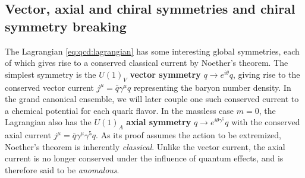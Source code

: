 \subsection*{Vector, axial and chiral symmetries and chiral symmetry breaking}

The Lagrangian \eqref{eq:qcd:lagrangian} has some interesting global symmetries, each of which gives rise to a conserved classical current by Noether's theorem.
The simplest symmetry is the $U(1)_V$ \textbf{vector symmetry} $q \rightarrow e^{i \theta} q$, giving rise to the conserved vector current $j^\mu = \bar{q} \gamma^\mu q$ representing the baryon number density.
In the grand canonical ensemble, we will later couple one such conserved current to a chemical potential for each quark flavor.
In the massless case $m = 0$, the Lagrangian also has the $U(1)_A$ \textbf{axial symmetry} $q \rightarrow e^{i \theta \gamma^5} q$ with the conserved axial current $j^\mu = \bar{q} \gamma^\mu \gamma^5 q$.
As its proof assumes the action to be extremized, Noether's theorem is inherently \emph{classical}.
Unlike the vector current, the axial current is no longer conserved under the influence of quantum effects, and is therefore said to be \emph{anomalous}.

